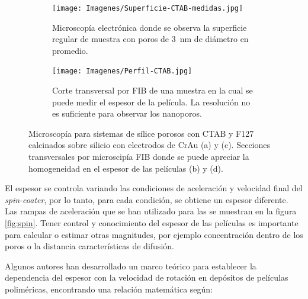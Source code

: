 \begin{figure}[bh!]
\begin{subfigure}[t]{0.495\textwidth}
			       		\label{fig:sem_homogeneidad2}
			       		\end{subfigure}	
			       	\begin{subfigure}[t]{0.495\textwidth}
			        	\texttt{[image: Imagenes/Superficie-CTAB-medidas.jpg]}
			       		\caption{Microscopía electrónica donde se observa la superficie regular de muestra \pdmC\space con poros de \SI{3}{nm} de diámetro en promedio.}
			       		\label{fig:sem_homogeneidad3}
			       		\end{subfigure}
					\begin{subfigure}[t]{0.49\textwidth}
			 	   	    \texttt{[image: Imagenes/Perfil-CTAB.jpg]}
			       		\caption{Corte transversal por FIB de una muestra \pdmC\space en la cual se puede medir el espesor de la película. La resolución no es suficiente para observar los nanoporos.}
			       		\label{fig:sem_homogeneidad4}
			       		\end{subfigure}	
					
					\vspace{-2mm}
					 \caption[MEB \pdmC\space y \pdmF.]{Microscopía para sistemas de sílice porosos con CTAB y F127 calcinados sobre silicio con electrodos de Cr\textbar Au (a) y (c). Secciones transversales por microscipía FIB donde se puede apreciar la homogeneidad en el espesor de las películas (b) y (d).}
					 \label{fig:sem_homogeneidad}	
				     \vspace*{0.2cm}
				     \end{figure}
 	
		 El espesor se controla variando las condiciones de aceleración y velocidad final del \textit{spin-coater}, por lo tanto, para cada condición, se obtiene un espesor diferente. Las rampas de aceleración que se han utilizado para las \pdm\space se muestran en la figura \ref{fig:spin}. Tener control y conocimiento del espesor de las películas es importante para calcular o estimar otras magnitudes, por ejemplo concentración dentro de los poros o la distancia características de difusión. 

		 Algunos autores han desarrollado un marco teórico para establecer la dependencia del espesor con la velocidad de rotación en depósitos de películas poliméricas, encontrando una relación matemática según: \cite{Norrman2005,Meyerhofer1978,Bornside1989,Lora1990}
	
